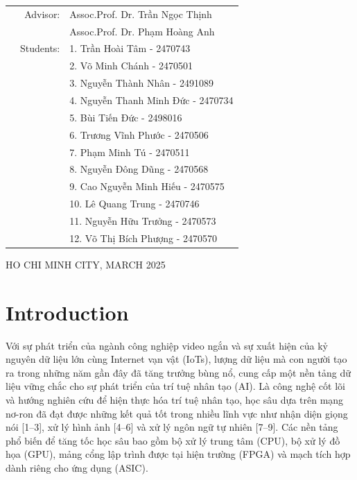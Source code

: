 \documentclass[a4paper]{article}
\begin{document}
\begin{titlepage}
\begin{table}[h]
\begin{tabular}{rrl}
\hspace{5 cm} & Advisor: & Assoc.Prof. Dr. Trần Ngọc Thịnh \\ 
&& Assoc.Prof. Dr. Phạm Hoàng Anh \\
& Students: &1. Trần Hoài Tâm - 2470743 \\
&&2. Võ Minh Chánh - 2470501 \\
&&3. Nguyễn Thành Nhân - 2491089 \\
&&4. Nguyễn Thanh Minh Đức - 2470734 \\
&&5. Bùi Tiến Đức - 2498016 \\
&&6. Trương Vĩnh Phước - 2470506 \\
&&7. Phạm Minh Tú - 2470511 \\
&&8. Nguyễn Đông Dũng - 2470568 \\
&&9. Cao Nguyễn Minh Hiếu - 2470575 \\
&&10. Lê Quang Trung - 2470746 \\
&&11. Nguyễn Hữu Trưởng - 2470573 \\
&&12. Võ Thị Bích Phượng - 2470570 \\


\end{tabular}
\end{table}

\begin{center}
{\footnotesize HO CHI MINH CITY, MARCH 2025}
\end{center}
\end{titlepage}



\newpage
\tableofcontents
\newpage

\section{Introduction}
Với sự phát triển của ngành công nghiệp video ngắn và sự xuất hiện của kỷ nguyên dữ liệu lớn cùng Internet vạn vật (IoTs), lượng dữ liệu mà con người tạo ra trong những năm gần đây đã tăng trưởng bùng nổ, cung cấp một nền tảng dữ liệu vững chắc cho sự phát triển của trí tuệ nhân tạo (AI). Là công nghệ cốt lõi và hướng nghiên cứu để hiện thực hóa trí tuệ nhân tạo, học sâu dựa trên mạng nơ-ron đã đạt được những kết quả tốt trong nhiều lĩnh vực như nhận diện giọng nói [1–3], xử lý hình ảnh [4–6] và xử lý ngôn ngữ tự nhiên [7–9]. Các nền tảng phổ biến để tăng tốc học sâu bao gồm bộ xử lý trung tâm (CPU), bộ xử lý đồ họa (GPU), mảng cổng lập trình được tại hiện trường (FPGA) và mạch tích hợp dành riêng cho ứng dụng (ASIC).
\end{document}
